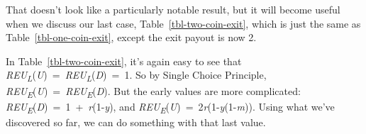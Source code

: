 \documentclass[
  12pt,
  letterpaper,
  DIV=11,
  numbers=noendperiod]{scrreprt}
\begin{document}
That doesn't look like a particularly notable result, but it will become
useful when we discuss our last case, Table~\ref{tbl-two-coin-exit},
which is just the same as Table~\ref{tbl-one-coin-exit}, except the exit
payout is now 2.

\begin{table}

\caption{\label{tbl-two-coin-exit}An exit game with exit payout 2.}

\begin{minipage}[t]{0.50\linewidth}



\end{minipage}%
%
\begin{minipage}[t]{0.50\linewidth}



\end{minipage}%

\end{table}%

In Table~\ref{tbl-two-coin-exit}, it's again easy to see that
\emph{REU\textsubscript{L}}(\emph{U})~=~\emph{REU\textsubscript{L}}(\emph{D})~=~1.
So by Single Choice Principle,
\emph{REU\textsubscript{E}}(\emph{U})~=~\emph{REU\textsubscript{E}}(\emph{D}).
But the early values are more complicated:
\emph{REU\textsubscript{E}}(\emph{D})~=~1~+~\emph{r}(1-\emph{y}), and
\emph{REU\textsubscript{E}}(\emph{U})~=~2\emph{r}(1-\emph{y}(1-\emph{m})).
Using what we've discovered so far, we can do something with that last
value.
\end{document}
